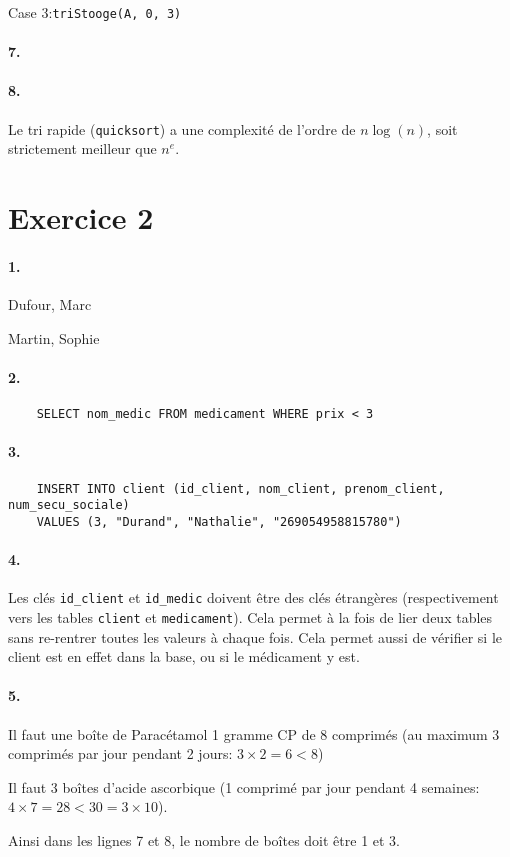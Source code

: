 \documentclass{article}
\begin{document}
Case 3\nobreakspace:\verb|triStooge(A, 0, 3)|

\paragraph*{7.}

\paragraph*{8.}
Le tri rapide (\verb|quicksort|) a une complexité de l’ordre de $n \log(n)$, soit
strictement meilleur que $n^e$.

\section*{Exercice 2}
\paragraph*{1.}
Dufour, Marc

Martin, Sophie

\paragraph*{2.}
\begin{verbatim}
    SELECT nom_medic FROM medicament WHERE prix < 3
\end{verbatim}

\paragraph*{3.}
\begin{verbatim}
    INSERT INTO client (id_client, nom_client, prenom_client, num_secu_sociale)
    VALUES (3, "Durand", "Nathalie", "269054958815780")
\end{verbatim}

\paragraph*{4.}
Les clés \verb|id_client| et \verb|id_medic| doivent être des clés étrangères
(respectivement vers les tables \verb|client| et \verb|medicament|). Cela permet
à la fois de lier deux tables sans re-rentrer toutes les valeurs à chaque fois.
Cela permet aussi de vérifier si le client est en effet dans la base, ou si le médicament
y est.

\paragraph*{5.}
Il faut une boîte de Paracétamol 1 gramme CP de 8 comprimés
(au maximum 3 comprimés par jour pendant 2 jours\nobreakspace: $3 \times 2 = 6 < 8$)

Il faut 3 boîtes d’acide ascorbique (1 comprimé par jour pendant 4 semaines\nobreakspace:
$4\times7=28<30=3\times10$).

Ainsi dans les lignes 7 et 8, le nombre de boîtes doit être 1 et 3.
\end{document}

